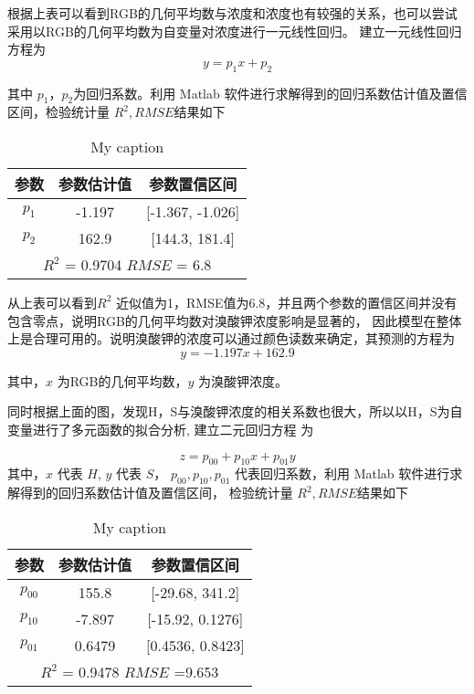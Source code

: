     根据上表可以看到RGB的几何平均数与浓度和浓度也有较强的关系，也可以尝试采用以RGB的几何平均数为自变量对浓度进行一元线性回归。
    建立一元线性回归方程为
     $$ y = p_1 x + p_2$$

    其中 $p_1，p_2$为回归系数。利用 Matlab 软件进行求解得到的回归系数估计值及置信区间，检验统计量 $R^2, RMSE $结果如下

    \begin{table}[H]
        \centering
        \caption{My caption}
        \label{my-label}
        \begin{tabular}{@{}ccc@{}}
        \toprule
        参数        & 参数估计值     & 参数置信区间                  \\ \midrule
        $p_1$     & -1.197    & {[}-1.367, -1.026{]}    \\
        $p_2$     & 162.9     & {[}144.3, 181.4{]}      \\
        \hline
        \multicolumn{3}{c}{$R^2$ = 0.9704 $RMSE$ = 6.8} \\ \bottomrule
        \end{tabular}
        \end{table}

    从上表可以看到$R^2$ 近似值为1，RMSE值为6.8，并且两个参数的置信区间并没有包含零点，说明RGB的几何平均数对溴酸钾浓度影响是显著的，
    因此模型在整体上是合理可用的。说明溴酸钾的浓度可以通过颜色读数来确定，其预测的方程为
    $$ y = -1.197 x + 162.9 $$

    其中，$x$ 为RGB的几何平均数，$y$ 为溴酸钾浓度。

    同时根据上面的图，发现H，S与溴酸钾浓度的相关系数也很大，所以以H，S为自变量进行了多元函数的拟合分析,
    建立二元回归方程 为

    $$ z = p_{00} + p_{10} x + p_{01} y$$
    其中，$x$ 代表 $H$, $y$ 代表 $S$， $p_{00},p_{10},p_{01}$ 代表回归系数，利用 Matlab 软件进行求解得到的回归系数估计值及置信区间，
    检验统计量 $R^2, RMSE $结果如下

    \begin{table}[H]
        \centering
        \caption{My caption}
        \label{my-label}
        \begin{tabular}{@{}ccc@{}}
        \toprule
        参数         & 参数估计值     & 参数置信区间                  \\ \midrule
        $p_00$     & 155.8     & {[}-29.68, 341.2{]}     \\
        $p_10$     & -7.897    & {[}-15.92, 0.1276{]}    \\
        $p_01$     & 0.6479    & {[}0.4536, 0.8423{]}    \\
        \hline
        \multicolumn{3}{c}{$R^2$ = 0.9478 $RMSE$ =9.653} \\ \bottomrule
        \end{tabular}
        \end{table}

